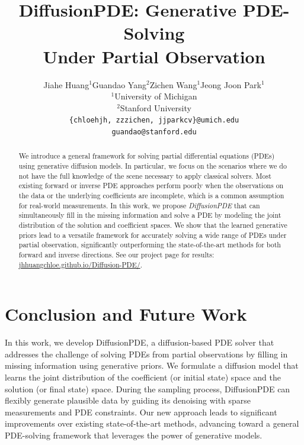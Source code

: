 \documentclass[square]{article}
\title{DiffusionPDE: Generative PDE-Solving \\Under Partial Observation}
\author{%
  Jiahe Huang$^1$\quad Guandao Yang$^2$\quad Zichen Wang$^1$\quad Jeong Joon Park$^1$\\
  $^1$University of Michigan\\
  $^2$Stanford University\\
  \texttt{\{chloehjh, zzzichen, jjparkcv\}@umich.edu} \\
  \texttt{guandao@stanford.edu}
}
\begin{document}
\maketitle

\begin{abstract}
We introduce a general framework for solving partial differential equations (PDEs) using generative diffusion models. In particular, we focus on the scenarios where we do not have the full knowledge of the scene necessary to apply classical solvers. Most existing forward or inverse PDE approaches perform poorly when the observations on the data or the underlying coefficients are incomplete, which is a common assumption for real-world measurements. In this work, we propose {\em DiffusionPDE} that can simultaneously fill in the missing information and solve a PDE by modeling the joint distribution of the solution and coefficient spaces. We show that the learned generative priors lead to a versatile framework for accurately solving a wide range of PDEs under partial observation, significantly outperforming the state-of-the-art methods for both forward and inverse directions. 
See our project page for results: \href{https://jhhuangchloe.github.io/Diffusion-PDE/}{jhhuangchloe.github.io/Diffusion-PDE/}.
\end{abstract}




\section{Conclusion and Future Work}\label{sec:conclusion_future_work}


In this work, we develop DiffusionPDE, a diffusion-based PDE solver that addresses the challenge of solving PDEs from partial observations by filling in missing information using generative priors. We formulate a diffusion model that learns the joint distribution of the coefficient (or initial state) space and the solution (or final state) space. During the sampling process, DiffusionPDE can flexibly generate plausible data by guiding its denoising with sparse measurements and PDE constraints. Our new approach leads to significant improvements over existing state-of-the-art methods, advancing toward a general PDE-solving framework that leverages the power of generative models.
\end{document}
